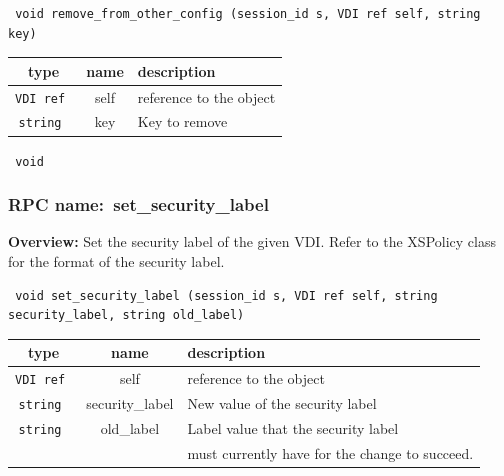 \begin{verbatim} void remove_from_other_config (session_id s, VDI ref self, string key)\end{verbatim}



 
\vspace{0.3cm}
\begin{tabular}{|c|c|p{7cm}|}
 \hline
{\bf type} & {\bf name} & {\bf description} \\ \hline
{\tt VDI ref } & self & reference to the object \\ \hline 

{\tt string } & key & Key to remove \\ \hline 

\end{tabular}

\vspace{0.3cm}

{\tt 
void
}



\vspace{0.3cm}
\vspace{0.3cm}
\vspace{0.3cm}
\subsubsection{RPC name:~set\_security\_label}

{\bf Overview:}
Set the security label of the given VDI. Refer to the XSPolicy class
for the format of the security label.

\begin{verbatim} void set_security_label (session_id s, VDI ref self, string
security_label, string old_label)\end{verbatim}




\vspace{0.3cm}
\begin{tabular}{|c|c|p{7cm}|}
 \hline
{\bf type} & {\bf name} & {\bf description} \\ \hline
{\tt VDI ref } & self & reference to the object \\ \hline

{\tt string } & security\_label & New value of the security label \\ \hline
{\tt string } & old\_label & Label value that the security label \\
& & must currently have for the change to succeed.\\ \hline
\end{tabular}

